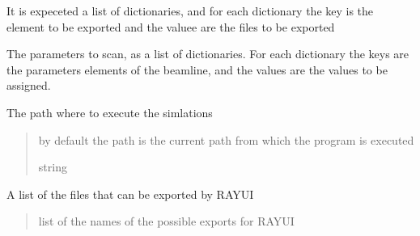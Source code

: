 \documentclass[letterpaper,10pt,english]{sphinxmanual}
\begin{document}
\begin{fulllineitems}
\begin{fulllineitems}
\sphinxAtStartPar
It is expeceted a list of dictionaries, and for each dictionary the key is the element
to be exported and the valuee are the files to be exported

\end{fulllineitems}


\begin{fulllineitems}
\label{\detokenize{code_documentation:raypyng.simulate.Simulate.params}}
\pysigstartsignatures
{}
\pysigstopsignatures
\sphinxAtStartPar
The parameters to scan, as a list of dictionaries.
For each dictionary the keys are the parameters elements of the beamline, and the values are the
values to be assigned.

\end{fulllineitems}


\begin{fulllineitems}
\label{\detokenize{code_documentation:raypyng.simulate.Simulate.path}}
\pysigstartsignatures
{}
\pysigstopsignatures
\sphinxAtStartPar
The path where to execute the simlations
\begin{quote}\begin{description}
\sphinxAtStartPar
by default the path is the current path from which
the program is executed

\sphinxAtStartPar
string

\end{description}\end{quote}

\end{fulllineitems}


\begin{fulllineitems}
\label{\detokenize{code_documentation:raypyng.simulate.Simulate.possible_exports}}
\pysigstartsignatures
{}
\pysigstopsignatures
\sphinxAtStartPar
A list of the files that can be exported by RAY\sphinxhyphen{}UI
\begin{quote}\begin{description}
\sphinxAtStartPar
list of the names of the possible exports for RAY\sphinxhyphen{}UI


\end{description}
\end{quote}
\end{fulllineitems}
\end{fulllineitems}
\end{document}
